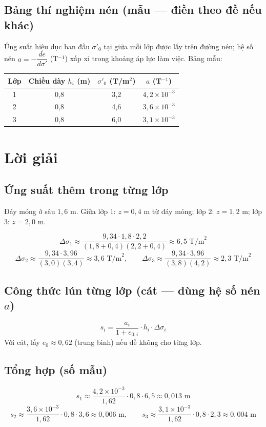 \documentclass[12pt,a4paper]{article}
\begin{document}
\subsection{Bảng thí nghiệm nén (mẫu --- điền theo đề nếu khác)}
Ứng suất hiệu dục ban đầu $\sigma'_0$ tại giữa mỗi lớp được lấy trên đường nén; hệ số nén $a = -\dfrac{de}{d\sigma'}$ (T$^{-1}$) xấp xỉ trong khoảng áp lực làm việc. Bảng mẫu:

\begin{table}[H]
\centering
\begin{tabular}{cccc}
\toprule
\textbf{Lớp} & \textbf{Chiều dày $h_i$ (m)} & \textbf{$\sigma'_{0}$ (T/m$^2$)} & \textbf{$a$ (T$^{-1}$)} \\
\midrule
1 & 0{,}8 & 3{,}2 & $4{,}2 \times 10^{-3}$ \\
2 & 0{,}8 & 4{,}6 & $3{,}6 \times 10^{-3}$ \\
3 & 0{,}8 & 6{,}0 & $3{,}1 \times 10^{-3}$ \\
\bottomrule
\end{tabular}
\end{table}

\section{Lời giải}
\subsection{Ứng suất thêm trong từng lớp}
Đáy móng ở sâu $1{,}6$ m. Giữa lớp 1: $z = 0{,}4$ m từ đáy móng; lớp 2: $z = 1{,}2$ m; lớp 3: $z = 2{,}0$ m.

\[ \Delta\sigma_1 \approx \frac{9{,}34 \cdot 1{,}8 \cdot 2{,}2}{(1{,}8+0{,}4)(2{,}2+0{,}4)} \approx 6{,}5 \text{ T/m}^2 \]
\[ \Delta\sigma_2 \approx \frac{9{,}34 \cdot 3{,}96}{(3{,}0)(3{,}4)} \approx 3{,}6 \text{ T/m}^2, \qquad
   \Delta\sigma_3 \approx \frac{9{,}34 \cdot 3{,}96}{(3{,}8)(4{,}2)} \approx 2{,}3 \text{ T/m}^2 \]

\subsection{Công thức lún từng lớp (cát --- dùng hệ số nén $a$)}
\[ s_i = \frac{a_i}{1+e_{0,i}} \cdot h_i \cdot \Delta\sigma_i \]
Với cát, lấy $e_0 \approx 0{,}62$ (trung bình) nếu đề không cho từng lớp.

\subsection{Tổng hợp (số mẫu)}
\[ s_1 \approx \frac{4{,}2 \times 10^{-3}}{1{,}62} \cdot 0{,}8 \cdot 6{,}5 \approx 0{,}013 \text{ m} \]
\[ s_2 \approx \frac{3{,}6 \times 10^{-3}}{1{,}62} \cdot 0{,}8 \cdot 3{,}6 \approx 0{,}006 \text{ m}, \qquad
   s_3 \approx \frac{3{,}1 \times 10^{-3}}{1{,}62} \cdot 0{,}8 \cdot 2{,}3 \approx 0{,}004 \text{ m} \]
\end{document}
